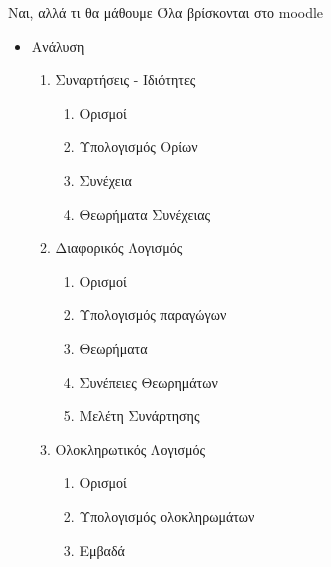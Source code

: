 \documentclass{presentation}
\begin{document}
\begin{frame}{Ναι, αλλά τι θα μάθουμε}
      Όλα βρίσκονται στο moodle
      \begin{itemize}
            \item<1->Ανάλυση \pause
            \begin{enumerate}
                  \item Συναρτήσεις - Ιδιότητες
                        \begin{enumerate}
                              \item Ορισμοί
                              \item Υπολογισμός Ορίων
                              \item Συνέχεια
                              \item Θεωρήματα Συνέχειας
                        \end{enumerate}
                  \item Διαφορικός Λογισμός
                        \begin{enumerate}
                              \item Ορισμοί
                              \item Υπολογισμός παραγώγων
                              \item Θεωρήματα
                              \item Συνέπειες Θεωρημάτων
                              \item Μελέτη Συνάρτησης
                        \end{enumerate}
                  \item Ολοκληρωτικός Λογισμός
                        \begin{enumerate}
                              \item Ορισμοί
                              \item Υπολογισμός ολοκληρωμάτων
                              \item Εμβαδά
                        \end{enumerate}
            \end{enumerate}
      \end{itemize}
\end{frame}
\end{document}
